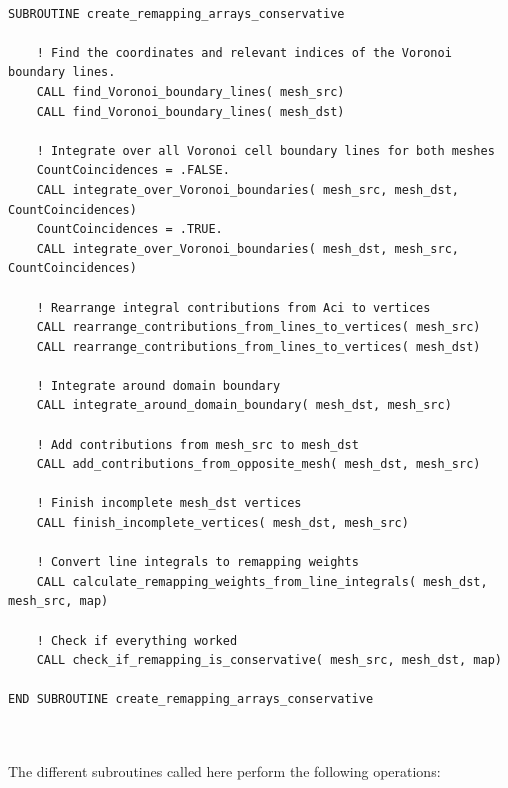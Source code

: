 \documentclass{article}
\begin{document}
\begin{lstlisting}

SUBROUTINE create_remapping_arrays_conservative

    ! Find the coordinates and relevant indices of the Voronoi boundary lines.
    CALL find_Voronoi_boundary_lines( mesh_src)
    CALL find_Voronoi_boundary_lines( mesh_dst)

    ! Integrate over all Voronoi cell boundary lines for both meshes
    CountCoincidences = .FALSE.  
    CALL integrate_over_Voronoi_boundaries( mesh_src, mesh_dst, CountCoincidences)
    CountCoincidences = .TRUE.  
    CALL integrate_over_Voronoi_boundaries( mesh_dst, mesh_src, CountCoincidences)

    ! Rearrange integral contributions from Aci to vertices
    CALL rearrange_contributions_from_lines_to_vertices( mesh_src)
    CALL rearrange_contributions_from_lines_to_vertices( mesh_dst)

    ! Integrate around domain boundary
    CALL integrate_around_domain_boundary( mesh_dst, mesh_src)

    ! Add contributions from mesh_src to mesh_dst
    CALL add_contributions_from_opposite_mesh( mesh_dst, mesh_src)

    ! Finish incomplete mesh_dst vertices
    CALL finish_incomplete_vertices( mesh_dst, mesh_src)

    ! Convert line integrals to remapping weights
    CALL calculate_remapping_weights_from_line_integrals( mesh_dst, mesh_src, map)
      
    ! Check if everything worked
    CALL check_if_remapping_is_conservative( mesh_src, mesh_dst, map)

END SUBROUTINE create_remapping_arrays_conservative

\end{lstlisting}
\hrulefill
\\
\\
The different subroutines called here perform the following operations:
\end{document}
